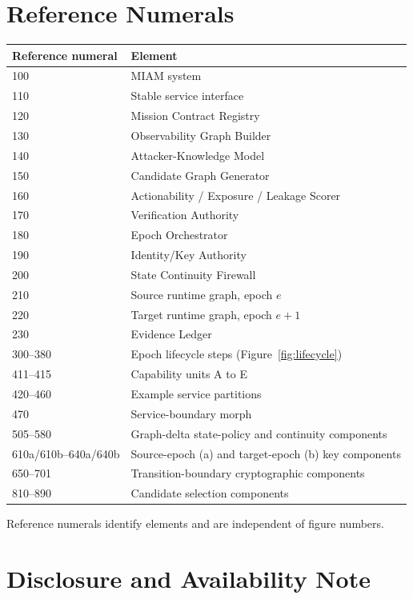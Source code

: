 \documentclass[11pt,letterpaper]{article}
\begin{document}
\section{Reference Numerals}

\begin{center}
\small
\begin{tabular}{ll}
\toprule
Reference numeral & Element\\
\midrule
100 & MIAM system\\
110 & Stable service interface\\
120 & Mission Contract Registry\\
130 & Observability Graph Builder\\
140 & Attacker-Knowledge Model\\
150 & Candidate Graph Generator\\
160 & Actionability / Exposure / Leakage Scorer\\
170 & Verification Authority\\
180 & Epoch Orchestrator\\
190 & Identity/Key Authority\\
200 & State Continuity Firewall\\
210 & Source runtime graph, epoch $e$\\
220 & Target runtime graph, epoch $e{+}1$\\
230 & Evidence Ledger\\
300--380 & Epoch lifecycle steps (Figure~\ref{fig:lifecycle})\\
411--415 & Capability units A to E\\
420--460 & Example service partitions\\
470 & Service-boundary morph\\
505--580 & Graph-delta state-policy and continuity components\\
610a/610b--640a/640b & Source-epoch (a) and target-epoch (b) key components\\
650--701 & Transition-boundary cryptographic components\\
810--890 & Candidate selection components\\
\bottomrule
\end{tabular}
\end{center}
\noindent Reference numerals identify elements and are independent of figure numbers.

\section{Disclosure and Availability Note}
\end{document}
